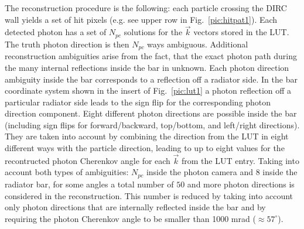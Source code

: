 The reconstruction procedure is the following: each particle crossing the DIRC wall yields a set of hit pixels (e.g. see upper row in Fig.~\ref{pic:hitpat1}). Each detected photon has a set of $N_{pc}$ solutions for the $\vec k$ vectors stored in the LUT. The truth photon direction is then $N_{pc}$ ways ambiguous. Additional reconstruction ambiguities arise from the fact, that the exact photon path during the many internal reflections inside the bar in unknown.  
Each photon direction ambiguity inside the bar corresponds to a reflection off a radiator side. In the bar coordinate system shown in the insert of Fig.~\ref{pic:lut1} a photon reflection off a particular radiator side leads to the sign flip for the corresponding photon direction component. Eight different photon directions are possible inside the bar (including sign flips for forward/backward, top/bottom, and left/right directions). They are taken into account by combining the direction from the LUT in eight different ways with the particle direction, leading to up to eight values for the recontructed photon Cherenkov angle for each $\vec k$ from the LUT entry.
Taking into account both types of ambiguities: $N_{pc}$ inside the photon camera and $8$ inside the radiator bar, for some angles a total number of $50$ and more photon directions is considered in the reconstruction.  This number is reduced by taking into account only photon directions that are internally reflected inside the bar and by requiring the photon Cherenkov angle to be smaller than 1000 mrad ($\approx 57^{\circ}$).


